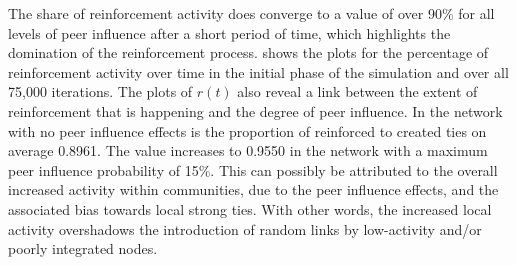  The share of reinforcement activity does converge to a value of over 90\% for all levels of peer influence after a short period of time, which highlights the domination of the reinforcement process.
 shows the plots for the percentage of reinforcement activity over time in the initial phase of the simulation and over all 75,000 iterations.
The plots of \( r(t) \) also reveal a link between the extent of reinforcement that is happening and the degree of peer influence.
In the network with no peer influence effects is the proportion of reinforced to created ties on average 0.8961.
The value increases to 0.9550 in the network with a maximum peer influence probability of 15\%.
This can possibly be attributed to the overall increased activity within communities, due to the peer influence effects, and the associated bias towards local strong ties.
With other words, the increased local activity overshadows the introduction of random links by low-activity and/or poorly integrated nodes.



